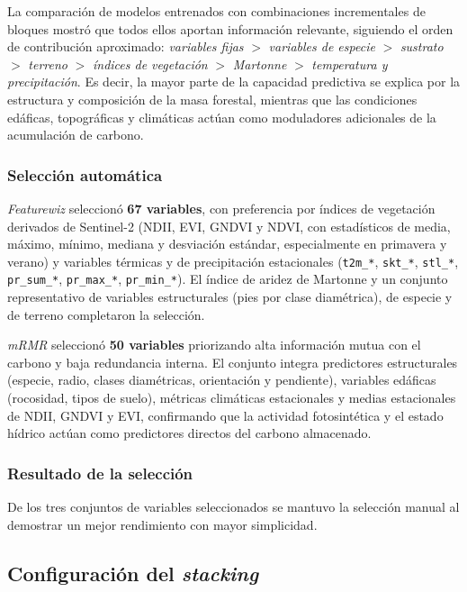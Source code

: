La comparación de modelos entrenados con combinaciones incrementales de bloques mostró que todos ellos aportan información relevante, siguiendo el orden de contribución aproximado: \textit{variables fijas} $>$ \textit{variables de especie} $>$ \textit{sustrato} $>$ \textit{terreno} $>$ \textit{índices de vegetación} $>$ \textit{Martonne} $>$ \textit{temperatura y precipitación}. Es decir, la mayor parte de la capacidad predictiva se explica por la estructura y composición de la masa forestal, mientras que las condiciones edáficas, topográficas y climáticas actúan como moduladores adicionales de la acumulación de carbono.

\subsubsection{Selección automática}

\textit{Featurewiz} seleccionó \textbf{67 variables}, con preferencia por índices de vegetación derivados de Sentinel-2 (NDII, EVI, GNDVI y NDVI, con estadísticos de media, máximo, mínimo, mediana y desviación estándar, especialmente en primavera y verano) y variables térmicas y de precipitación estacionales (\texttt{t2m\_*}, \texttt{skt\_*}, \texttt{stl\_*}, \texttt{pr\_sum\_*}, \texttt{pr\_max\_*}, \texttt{pr\_min\_*}). El índice de aridez de Martonne y un conjunto representativo de variables estructurales (pies por clase diamétrica), de especie y de terreno completaron la selección.

\textit{mRMR} seleccionó \textbf{50 variables} priorizando alta información mutua con el carbono y baja redundancia interna. El conjunto integra predictores estructurales (especie, radio, clases diamétricas, orientación y pendiente), variables edáficas (rocosidad, tipos de suelo), métricas climáticas estacionales y medias estacionales de NDII, GNDVI y EVI, confirmando que la actividad fotosintética y el estado hídrico actúan como predictores directos del carbono almacenado.

\subsubsection{Resultado de la selección}
De los tres conjuntos de variables seleccionados se mantuvo la selección manual al demostrar un mejor rendimiento con mayor simplicidad.

\subsection{Configuración del \textit{stacking}}

